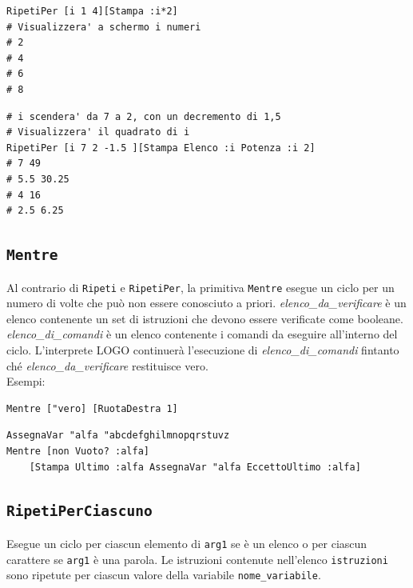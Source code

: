 \begin{lstlisting}[caption="Esempio di uso di \texttt{RipetiPer}"]
RipetiPer [i 1 4][Stampa :i*2]
# Visualizzera' a schermo i numeri
# 2
# 4
# 6
# 8
\end{lstlisting}

\begin{lstlisting}[caption="Esempio più complesso di uso di \texttt{RipetiPer}"]
# i scendera' da 7 a 2, con un decremento di 1,5
# Visualizzera' il quadrato di i
RipetiPer [i 7 2 -1.5 ][Stampa Elenco :i Potenza :i 2]
# 7 49
# 5.5 30.25
# 4 16
# 2.5 6.25
\end{lstlisting}



\subsection{\texttt{Mentre}}
\noindent 

Al contrario di \texttt{Ripeti} e \texttt{RipetiPer}, la primitiva \texttt{Mentre} esegue un ciclo per un numero di volte che può non essere conosciuto a priori.
\textit{elenco\_da\_verificare} è un elenco contenente un set di istruzioni che devono essere verificate come booleane. \textit{elenco\_di\_comandi} è un elenco contenente i comandi da eseguire all'interno del ciclo. L'interprete LOGO continuerà l'esecuzione di \textit{elenco\_di\_comandi} fintanto ché \textit{elenco\_da\_verificare} restituisce \textquotedbl vero.\\
Esempi:\\
\begin{lstlisting}[caption="La tartaruga ruota a destra all'infinito"]
Mentre ["vero] [RuotaDestra 1]
\end{lstlisting}


\begin{lstlisting}[caption="Viene percorso l'alfabeto all'indietro"]
AssegnaVar "alfa "abcdefghilmnopqrstuvz
Mentre [non Vuoto? :alfa] 
	[Stampa Ultimo :alfa AssegnaVar "alfa EccettoUltimo :alfa]
\end{lstlisting}


\subsection{\texttt{RipetiPerCiascuno}}

Esegue un ciclo per ciascun elemento di \texttt{arg1} se è un elenco o per ciascun carattere se \texttt{arg1} è una parola. Le istruzioni contenute nell'elenco \texttt{istruzioni} sono ripetute per ciascun valore della variabile \texttt{nome\_variabile}.\\


